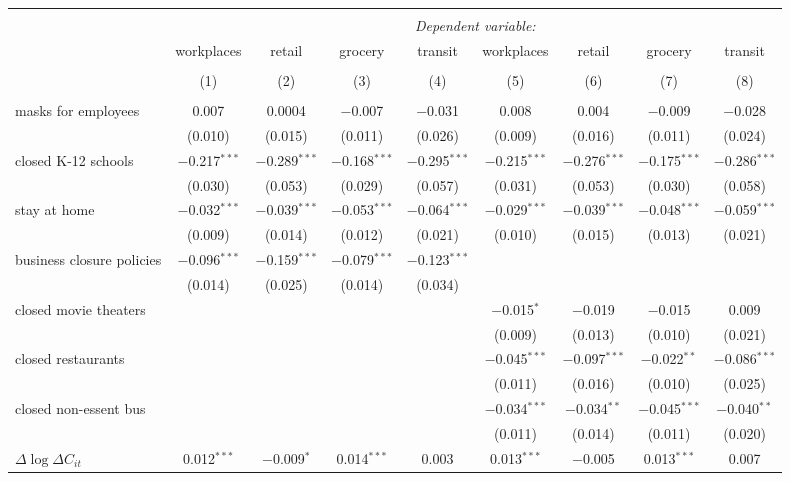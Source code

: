 \begin{tabular}{@{\extracolsep{1pt}}lcccccccc} 
\\[-1.8ex]\hline 
\hline \\[-1.8ex] 
 & \multicolumn{8}{c}{\textit{Dependent variable:}} \\ 
\cline{2-9} 
 & workplaces & retail & grocery & transit & workplaces & retail & grocery & transit \\ 
\\[-1.8ex] & (1) & (2) & (3) & (4) & (5) & (6) & (7) & (8)\\ 
\hline \\[-1.8ex] 
 masks for employees & 0.007 & 0.0004 & $-$0.007 & $-$0.031 & 0.008 & 0.004 & $-$0.009 & $-$0.028 \\ 
  & (0.010) & (0.015) & (0.011) & (0.026) & (0.009) & (0.016) & (0.011) & (0.024) \\ 
  closed K-12 schools & $-$0.217$^{***}$ & $-$0.289$^{***}$ & $-$0.168$^{***}$ & $-$0.295$^{***}$ & $-$0.215$^{***}$ & $-$0.276$^{***}$ & $-$0.175$^{***}$ & $-$0.286$^{***}$ \\ 
  & (0.030) & (0.053) & (0.029) & (0.057) & (0.031) & (0.053) & (0.030) & (0.058) \\ 
  stay at home & $-$0.032$^{***}$ & $-$0.039$^{***}$ & $-$0.053$^{***}$ & $-$0.064$^{***}$ & $-$0.029$^{***}$ & $-$0.039$^{***}$ & $-$0.048$^{***}$ & $-$0.059$^{***}$ \\ 
  & (0.009) & (0.014) & (0.012) & (0.021) & (0.010) & (0.015) & (0.013) & (0.021) \\ 
  business closure policies & $-$0.096$^{***}$ & $-$0.159$^{***}$ & $-$0.079$^{***}$ & $-$0.123$^{***}$ &  &  &  &  \\ 
  & (0.014) & (0.025) & (0.014) & (0.034) &  &  &  &  \\ 
  closed movie theaters &  &  &  &  & $-$0.015$^{*}$ & $-$0.019 & $-$0.015 & 0.009 \\ 
  &  &  &  &  & (0.009) & (0.013) & (0.010) & (0.021) \\ 
  closed restaurants &  &  &  &  & $-$0.045$^{***}$ & $-$0.097$^{***}$ & $-$0.022$^{**}$ & $-$0.086$^{***}$ \\ 
  &  &  &  &  & (0.011) & (0.016) & (0.010) & (0.025) \\ 
  closed non-essent bus &  &  &  &  & $-$0.034$^{***}$ & $-$0.034$^{**}$ & $-$0.045$^{***}$ & $-$0.040$^{**}$ \\ 
  &  &  &  &  & (0.011) & (0.014) & (0.011) & (0.020) \\ 
  $\Delta \log \Delta C_{it}$ & 0.012$^{***}$ & $-$0.009$^{*}$ & 0.014$^{***}$ & 0.003 & 0.013$^{***}$ & $-$0.005 & 0.013$^{***}$ & 0.007 \\ 

\end{tabular}
